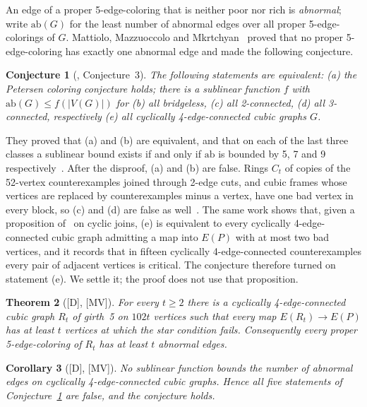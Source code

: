 \documentclass[11pt]{article}
\newtheorem{theorem}{Theorem}[section]
\newtheorem{corollary}[theorem]{Corollary}
\newtheorem{conjecture}[theorem]{Conjecture}
\theoremstyle{definition}
\theoremstyle{remark}
\newcommand{\PG}{P}
\newcommand{\ab}{\mathrm{ab}}
\newcommand{\claim}[1]{\textup{[#1]}}
\begin{document}
An edge of a proper 5-edge-coloring that is neither poor nor rich is \emph{abnormal}; write
$\ab(G)$ for the least number of abnormal edges over all proper 5-edge-colorings of $G$. Mattiolo,
Mazzuoccolo and Mkrtchyan~\cite{MMM2021} proved that no proper 5-edge-coloring has exactly one
abnormal edge and made the following conjecture.

\begin{conjecture}[\cite{MMM2021}, Conjecture~3]\label{conj:mmm}
The following statements are equivalent: (a) the Petersen coloring conjecture holds; there is a
sublinear function $f$ with $\ab(G) \le f(|V(G)|)$ for (b) all bridgeless, (c) all 2-connected,
(d) all 3-connected, respectively (e) all cyclically 4-edge-connected cubic graphs $G$.
\end{conjecture}

They proved that (a) and (b) are equivalent, and that on each of the last three classes a
sublinear bound exists if and only if $\ab$ is bounded by 5, 7 and 9
respectively~\cite[Theorems~1--4]{MMM2021}. After the disproof, (a) and (b) are false. Rings $C_t$ of
copies of the 52-vertex counterexamples joined through 2-edge cuts, and cubic frames whose vertices
are replaced by counterexamples minus a vertex, have one bad vertex in every block, so (c) and (d)
are false as well~\cite{Audit2026}. The same work shows that, given a proposition of~\cite{MMM2021}
on cyclic joins, (e) is equivalent to every cyclically 4-edge-connected cubic graph admitting a map
into $E(\PG)$ with at most two bad vertices, and it records that in fifteen cyclically
4-edge-connected counterexamples every pair of adjacent vertices is critical. The conjecture
therefore turned on statement (e). We settle it; the proof does not use that proposition.

\begin{theorem}[\claim{D}, \claim{MV}]\label{thm:main}
For every $t \ge 2$ there is a cyclically 4-edge-connected cubic graph $R_t$ of girth~5 on $102t$
vertices such that every map $E(R_t) \to E(\PG)$ has at least $t$ vertices at which the star
condition fails. Consequently every proper 5-edge-coloring of $R_t$ has at least $t$ abnormal
edges.
\end{theorem}

\begin{corollary}[\claim{D}, \claim{MV}]\label{cor:e}
No sublinear function bounds the number of abnormal edges on cyclically 4-edge-connected cubic
graphs. Hence all five statements of Conjecture~\ref{conj:mmm} are false, and the conjecture
holds.
\end{corollary}
\end{document}
